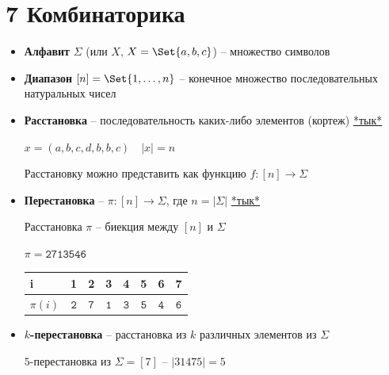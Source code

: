 \documentclass[12pt]{article}
\begin{document}
    \section{7 \quad Комбинаторика}

    \begin{itemize}
        \item \textbf{Алфавит} $\Sigma$ (или $X$, \Exs $X = \Set{a, b, c}$) -- множество символов

        \item \textbf{Диапазон} $[n] = \Set{1, \dots, n}$ -- конечное множество последовательных натуральных чисел

        \item \textbf{Расстановка} -- последовательность каких-либо элементов (кортеж)
        \hfill\href{https://ru.wikipedia.org/wiki/%D0%9A%D0%BE%D1%80%D1%82%D0%B5%D0%B6_(%D0%B8%D0%BD%D1%84%D0%BE%D1%80%D0%BC%D0%B0%D1%82%D0%B8%D0%BA%D0%B0)#%D0%92_%D0%BC%D0%B0%D1%82%D0%B5%D0%BC%D0%B0%D1%82%D0%B8%D0%BA%D0%B5}{*тык*}

        \Exs $x = (a, b, c, d, b, b, c) \quad |x| = n$

        Расстановку можно представить как функцию $f : [n] \to \Sigma$

        \item \textbf{Перестановка} -- $\pi : [n] \to \Sigma$, где $n = |\Sigma|$
        \hfill\href{https://ru.wikipedia.org/wiki/%D0%9F%D0%B5%D1%80%D0%B5%D1%81%D1%82%D0%B0%D0%BD%D0%BE%D0%B2%D0%BA%D0%B0}{*тык*}

        Расстановка $\pi$ -- биекция между $[n]$ и $\Sigma$

        \Exs $\pi = \mathtt{2713546}$

        \vspace{3mm}

        \begin{tabular}{l|ccccccc}
            i      & 1          & 2          & 3          & 4          & 5          & 6          & 7          \\
            \hline
            $\pi(i)$ & $\mathtt{2}$ & $\mathtt{7}$ & $\mathtt{1}$ & $\mathtt{3}$ & $\mathtt{5}$ & $\mathtt{4}$ & $\mathtt{6}$
        \end{tabular}

        \item \textbf{$k$-перестановка} -- расстановка из $k$ различных элементов из $\Sigma$

        \Exs $5$-перестановка из $\Sigma = [7]$ -- $|31475| = 5$


\end{itemize}
\end{document}
